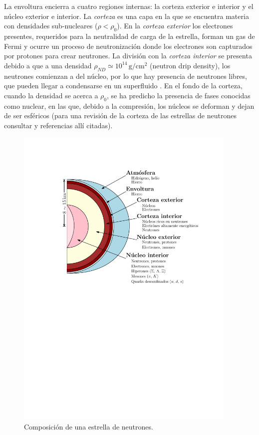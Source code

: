 La envoltura encierra a cuatro regiones internas: la corteza exterior e interior y el núcleo exterior e interior. La \emph{corteza} es una capa en la que se encuentra materia con densidades sub-nucleares ($\rho < \rho_0$). En la \emph{corteza exterior} los electrones presentes, requeridos para la neutralidad de carga de la estrella, forman un gas de Fermi y ocurre un proceso de neutronización donde los electrones son capturados por protones para crear neutrones. La división con la \emph{corteza interior} se presenta debido a que a una densidad $\rho_{ND}\simeq 10^{14}\, \si{\gram\per\centi\metre^2}$ (neutron drip density), los neutrones comienzan a  del núcleo, por lo que hay presencia de neutrones libres, que pueden llegar a condensarse en un superfluido \cite{Baldo2005SuperfluidityMatter}. En el fondo de la corteza, cuando la densidad se acerca a $\rho_0$, se ha predicho la presencia de fases conocidas como  nuclear, en las que, debido a la compresión, los núcleos se deforman y dejan de ser esféricos (para una revisión de la corteza de las estrellas de neutrones consultar \cite{Chamel2008} y referencias allí citadas). 

\begin{figure}[H]
    \centering
    \includegraphics[width=300pt]{figures/neutronstar.pdf}
    \caption{Composición de una estrella de neutrones.\protect\footnotemark}
    \label{NSC}
\end{figure}


